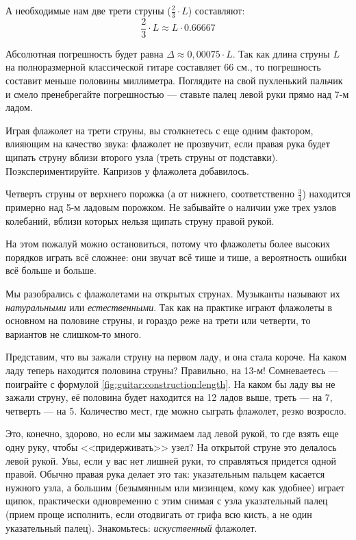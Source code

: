 А необходимые нам две трети струны ($\frac{2}{3}\cdot L$) составляют:
\[
    \frac{2}{3}\cdot L \approx L\cdot 0.66667
\]

Абсолютная погрешность будет равна $\Delta \approx 0,00075 \cdot L$. Так как длина струны $L$ на полноразмерной классической гитаре составляет $66$ см., то погрешность составит меньше половины миллиметра. Поглядите на свой пухленький пальчик и смело пренебрегайте погрешностью --- ставьте палец левой руки прямо над 7-м ладом.

Играя флажолет на трети струны, вы столкнетесь с еще одним фактором, влияющим на качество звука: флажолет не прозвучит, если правая рука будет щипать струну вблизи второго узла (треть струны от подставки). Поэкспериментируйте. Капризов у флажолета добавилось.

Четверть струны от верхнего порожка (а от нижнего, соответственно $\frac{3}{4}$) находится примерно над 5-м ладовым порожком. Не забывайте о наличии уже трех узлов колебаний, вблизи которых нельзя щипать струну правой рукой.

На этом пожалуй можно остановиться, потому что флажолеты более высоких порядков играть всё сложнее: они звучат всё тише и тише, а вероятность ошибки всё больше и больше.

Мы разобрались с флажолетами на открытых струнах. Музыканты называют их \emph{натуральными} или \emph{естественными}. Так как на практике играют флажолеты в основном на половине струны, и гораздо реже на трети или четверти, то вариантов не слишком-то много.

Представим, что вы зажали струну на первом ладу, и она стала короче. На каком ладу теперь находится половина струны? Правильно, на 13-м! Сомневаетесь --- поиграйте с формулой \ref{fig:guitar:construction:length}. На каком бы ладу вы не зажали струну, её половина будет находится на 12 ладов выше, треть --- на 7, четверть --- на 5. Количество мест, где можно сыграть флажолет, резко возросло.

Это, конечно, здорово, но если мы зажимаем лад левой рукой, то где взять еще одну руку, чтобы <<придерживать>> узел? На открытой струне это делалось левой рукой. Увы, если у вас нет лишней руки, то справляться придется одной правой. Обычно правая рука делает это так: указательным пальцем касается нужного узла, а большим (безымянным или мизинцем, кому как удобнее) играет щипок, практически одновременно с этим снимая с узла указательный палец (прием проще исполнить, если отодвигать от грифа всю кисть, а не один указательный палец). Знакомьтесь: \emph{искуственный} флажолет.

